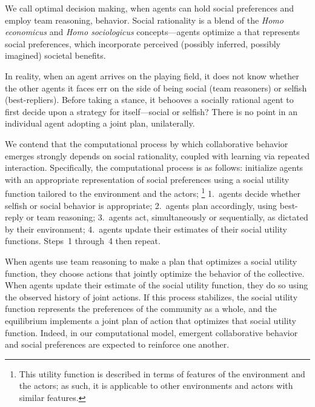We call optimal decision making, when agents can hold social
preferences and employ team reasoning, 
behavior.  Social rationality is a blend of the \emph{Homo
  economicus\/} and \emph{Homo sociologicus\/} concepts---agents
optimize a  that
represents social preferences, which incorporate perceived (possibly
inferred, possibly imagined) societal benefits.

In reality, when an agent arrives on the playing field, it does not
know whether the other agents it faces err on the side of being social
(team reasoners) or selfish (best-repliers).  Before taking a stance,
it behooves a socially rational agent to first decide upon a strategy
for itself---social or selfish?  There is no point in an individual
agent adopting a joint plan, unilaterally.

We contend that the computational process by which collaborative
behavior emerges strongly depends on social rationality, coupled with
learning via repeated interaction.
%
Specifically, the computational process is as follows: initialize
agents with an appropriate representation of social preferences using
a social utility function tailored to the environment and the actors;%
\footnote{This utility function is described in terms of features of the environment and the actors;
as such, it is applicable to other environments and actors with similar features.}
1.~agents decide whether selfish or social behavior is appropriate;
2.~agents plan accordingly, using best-reply or team reasoning;
3.~agents act, simultaneously or sequentially, as dictated by their environment;
4.~agents update their estimates of their social utility functions.
Steps~1 through~4 then repeat.

When agents use team reasoning to make a plan that optimizes a social
utility function, they choose actions that jointly optimize the
behavior of the collective.
When agents update their estimate of the social utility function, they
do so using the observed history of joint actions.
If this process stabilizes, the social utility function represents the
preferences of the community as a whole, 
and the equilibrium implements a joint plan of action that optimizes
that social utility function.  Indeed, in our computational model,
emergent collaborative behavior and social preferences are expected to
reinforce one another.

